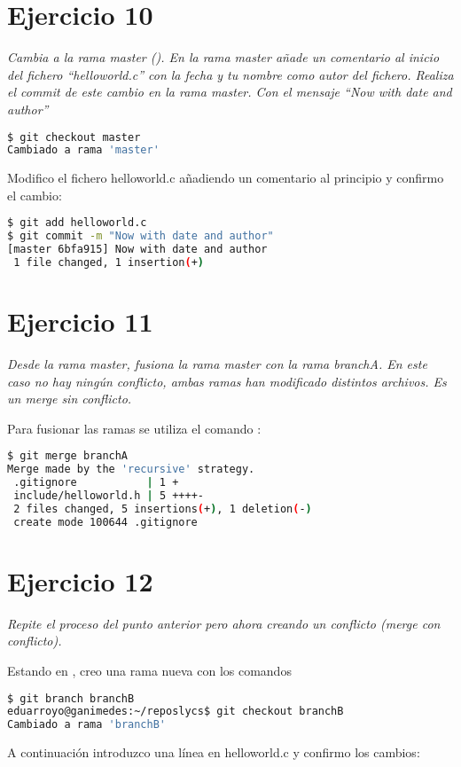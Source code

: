 \section{Ejercicio 10}
\begin{center}
    \parbox{12cm}{\justify\textit{
        Cambia a la rama master (). En la rama master añade un comentario al inicio del fichero ``helloworld.c'' con la fecha y tu nombre como autor del fichero. Realiza el commit de este cambio en la rama master. Con el mensaje ``Now with date and author''
    }}
\end{center}

\begin{lstlisting}[basicstyle=\small,xrightmargin=.10\textwidth,xleftmargin=.10\textwidth,language=bash]
$ git checkout master
Cambiado a rama 'master'
\end{lstlisting}
Modifico el fichero helloworld.c añadiendo un comentario al principio y confirmo el cambio:
\begin{lstlisting}[basicstyle=\small,xrightmargin=.10\textwidth,xleftmargin=.10\textwidth,language=bash]
$ git add helloworld.c
$ git commit -m "Now with date and author"
[master 6bfa915] Now with date and author
 1 file changed, 1 insertion(+)
\end{lstlisting}

\section{Ejercicio 11}
\begin{center}
    \parbox{12cm}{\justify\textit{
        Desde la rama master, fusiona la rama master con la rama branchA. En este caso no hay ningún conflicto, ambas ramas han modificado distintos archivos. Es un merge sin conflicto.
    }}
\end{center}

Para fusionar las ramas se utiliza el comando :
\begin{lstlisting}[basicstyle=\small,xrightmargin=.10\textwidth,xleftmargin=.10\textwidth,language=bash]
$ git merge branchA
Merge made by the 'recursive' strategy.
 .gitignore           | 1 +
 include/helloworld.h | 5 ++++-
 2 files changed, 5 insertions(+), 1 deletion(-)
 create mode 100644 .gitignore
\end{lstlisting}

\section{Ejercicio 12}
\begin{center}
    \parbox{12cm}{\justify\textit{
        Repite el proceso del punto anterior pero ahora creando un conflicto (merge con conflicto).
    }}
\end{center}
Estando en , creo una rama nueva con los comandos
\begin{lstlisting}[basicstyle=\small,xrightmargin=.10\textwidth,xleftmargin=.10\textwidth,language=bash]
$ git branch branchB
eduarroyo@ganimedes:~/reposlycs$ git checkout branchB
Cambiado a rama 'branchB'
\end{lstlisting}
A continuación introduzco una línea en helloworld.c y confirmo los cambios:

